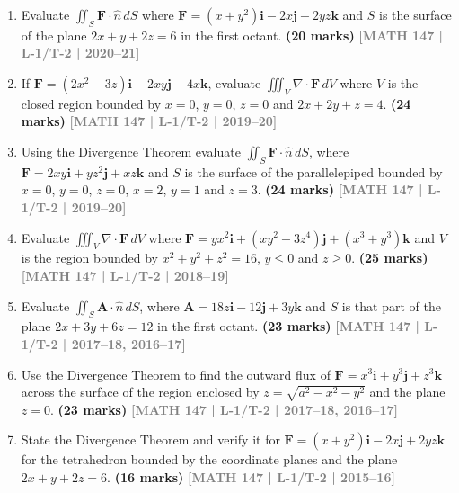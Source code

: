 \documentclass[12pt,a3paper]{article}
\newcommand{\yr}[1]{\hfill\textcolor{gray}{\small\textbf{[#1]}}}
\newcommand{\mk}[1]{\textcolor{orange!70!black}{\small\textbf{(#1 marks)}}}
\begin{document}
\begin{enumerate}
    
    \item Evaluate $\displaystyle\iint_{S}\mathbf{F}\cdot\hat{n}\,dS$ where $\mathbf{F}=(x+y^{2})\mathbf{i}-2x\mathbf{j}+2yz\mathbf{k}$ and $S$ is the surface of the plane $2x+y+2z=6$ in the first octant.
\mk{20} \yr{MATH 147 | L-1/T-2 | 2020--21}


\item If $\mathbf{F}=(2x^{2}-3z)\mathbf{i}-2xy\mathbf{j}-4x\mathbf{k}$, evaluate $\displaystyle\iiint_{V}\nabla\cdot\mathbf{F}\,dV$ where $V$ is the closed region bounded by $x=0$, $y=0$, $z=0$ and $2x+2y+z=4$.
\mk{24} \yr{MATH 147 | L-1/T-2 | 2019--20}


\item Using the Divergence Theorem evaluate $\displaystyle\iint_{S}\mathbf{F}\cdot\hat{n}\,dS$, where $\mathbf{F}=2xy\mathbf{i}+yz^{2}\mathbf{j}+xz\mathbf{k}$ and $S$ is the surface of the parallelepiped bounded by $x=0$, $y=0$, $z=0$, $x=2$, $y=1$ and $z=3$.
\mk{24} \yr{MATH 147 | L-1/T-2 | 2019--20}


\item Evaluate $\displaystyle\iiint_{V}\nabla\cdot\mathbf{F}\,dV$ where $\mathbf{F}=yx^{2}\mathbf{i}+(xy^{2}-3z^{4})\mathbf{j}+(x^{3}+y^{3})\mathbf{k}$ and $V$ is the region bounded by $x^{2}+y^{2}+z^{2}=16$, $y\le 0$ and $z\ge 0$.
\mk{25} \yr{MATH 147 | L-1/T-2 | 2018--19}


\item Evaluate $\displaystyle\iint_{S}\mathbf{A}\cdot\hat{n}\,dS$, where $\mathbf{A}=18z\mathbf{i}-12\mathbf{j}+3y\mathbf{k}$ and $S$ is that part of the plane $2x+3y+6z=12$ in the first octant.
\mk{23} \yr{MATH 147 | L-1/T-2 | 2017--18, 2016--17}


\item Use the Divergence Theorem to find the outward flux of $\mathbf{F}=x^{3}\mathbf{i}+y^{3}\mathbf{j}+z^{3}\mathbf{k}$ across the surface of the region enclosed by $z=\sqrt{a^{2}-x^{2}-y^{2}}$ and the plane $z=0$.
\mk{23} \yr{MATH 147 | L-1/T-2 | 2017--18, 2016--17}


\item State the Divergence Theorem and verify it for $\mathbf{F}=(x+y^{2})\mathbf{i}-2x\mathbf{j}+2yz\mathbf{k}$ for the tetrahedron bounded by the coordinate planes and the plane $2x+y+2z=6$.
\mk{16} \yr{MATH 147 | L-1/T-2 | 2015--16}


\end{enumerate}
\end{document}
